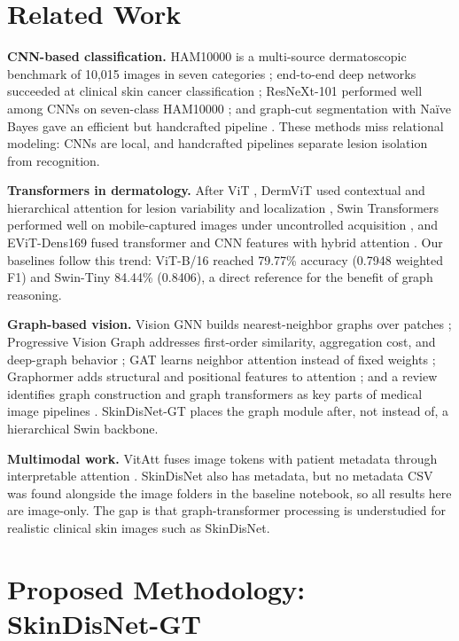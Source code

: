 \documentclass[conference]{IEEEtran}
\begin{document}
\section{Related Work}
\textbf{CNN-based classification.} HAM10000 is a multi-source dermatoscopic benchmark of 10,015 images in seven categories \cite{ref1}; end-to-end deep networks succeeded at clinical skin cancer classification \cite{ref2}; ResNeXt-101 performed well among CNNs on seven-class HAM10000 \cite{ref3}; and graph-cut segmentation with Na\"{i}ve Bayes gave an efficient but handcrafted pipeline \cite{ref4}. These methods miss relational modeling: CNNs are local, and handcrafted pipelines separate lesion isolation from recognition.

\textbf{Transformers in dermatology.} After ViT \cite{ref5}, DermViT used contextual and hierarchical attention for lesion variability and localization \cite{ref8}, Swin Transformers performed well on mobile-captured images under uncontrolled acquisition \cite{ref7}, and EViT-Dens169 fused transformer and CNN features with hybrid attention \cite{ref9}. Our baselines follow this trend: ViT-B/16 reached 79.77\% accuracy (0.7948 weighted F1) and Swin-Tiny 84.44\% (0.8406), a direct reference for the benefit of graph reasoning.

\textbf{Graph-based vision.} Vision GNN builds nearest-neighbor graphs over patches \cite{ref6}; Progressive Vision Graph addresses first-order similarity, aggregation cost, and deep-graph behavior \cite{ref11}; GAT learns neighbor attention instead of fixed weights \cite{ref12}; Graphormer adds structural and positional features to attention \cite{ref13}; and a review identifies graph construction and graph transformers as key parts of medical image pipelines \cite{ref14}. SkinDisNet-GT places the graph module after, not instead of, a hierarchical Swin backbone.

\textbf{Multimodal work.} VitAtt fuses image tokens with patient metadata through interpretable attention \cite{ref10}. SkinDisNet also has metadata, but no metadata CSV was found alongside the image folders in the baseline notebook, so all results here are image-only. The gap is that graph-transformer processing is understudied for realistic clinical skin images such as SkinDisNet.

\section{Proposed Methodology: SkinDisNet-GT}
\end{document}
